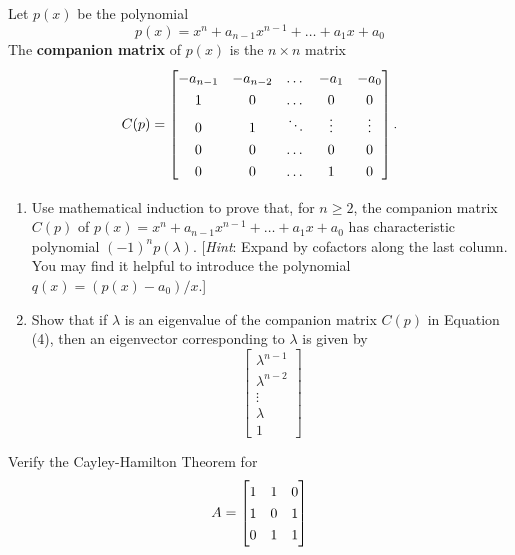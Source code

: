 \documentclass[12pt,letterpaper]{hmcpset}
\newcommand{\m}[1]{\renewcommand*{\arraystretch}{1.3} \begin{bmatrix} #1 \end{bmatrix}}
\begin{document}
\begin{solution}
\vfill
\end{solution}
\newpage

\begin{problem}[4.3.32]

    Let $p(x)$ be the polynomial
    \[
        p(x) = x^n + a_{n-1}x^{n-1} + \dots + a_1x + a_0
    \]
    The \textbf{companion matrix} of $p(x)$ is
    the $n \times n$ matrix
    \[
        C(p) = \m{-a_{n-1}&-a_{n-2}&\dots&-a_1&-a_0\\
                1&0&\dots&0&0\\
                0&1&\ddots&\vdots&\vdots\\
                0&0&\dots&0&0\\
                0&0&\dots&1&0}.
    \]

    \begin{enumerate}
    \item Use mathematical induction to prove that, for $n \geq 2$, the companion matrix $C(p)$ of $p(x) = x^n + a_{n-1}x^{n-1} + \dots + a_1x + a_0$ has characteristic polynomial $(-1)^np(\lambda)$. [\emph{Hint}: Expand by cofactors along the last column. You may find it helpful to introduce the polynomial $q(x) = (p(x) -a_0)/x$.]
    
    \item Show that if $\lambda$ is an eigenvalue of the companion matrix $C(p)$ in Equation (4), then an eigenvector corresponding to $\lambda$ is given by
        $$\m{\lambda^{n-1}\\\lambda^{n-2}\\ \vdots \\ \lambda \\ 1}$$
    \end{enumerate}

\end{problem}

\begin{solution}
\vfill
\end{solution}
\newpage

\begin{problem}[4.3.34]
Verify the Cayley-Hamilton Theorem for
$$ A = \m{1 & 1 & 0 \\ 1 & 0 & 1 \\ 0 & 1 & 1}$$
\end{problem}

\begin{solution}
\vfill
\end{solution}
\end{document}
